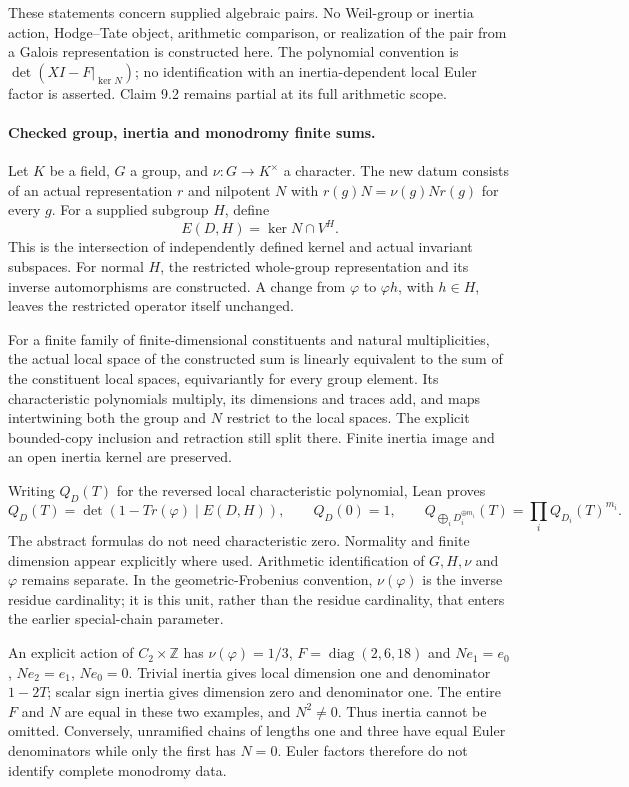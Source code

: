 \documentclass[11pt]{article}
\theoremstyle{definition}
\theoremstyle{remark}
\begin{document}
These statements concern supplied algebraic pairs. No Weil-group or inertia
action, Hodge--Tate object, arithmetic comparison, or realization of the pair
from a Galois representation is constructed here. The polynomial convention is
$\det(XI-F|_{\ker N})$; no identification with an inertia-dependent local
Euler factor is asserted. Claim 9.2 remains partial at its full arithmetic scope.


\paragraph{Checked group, inertia and monodromy finite sums.}\label{book:x-construction-12}
Let $K$ be a field, $G$ a group, and $\nu:G\to K^\times$ a character.
The new datum consists of an actual representation $r$ and nilpotent $N$ with
$r(g)N=\nu(g)Nr(g)$ for every $g$. For a supplied subgroup $H$, define
\[
 E(D,H)=\ker N\cap V^H.
\]
This is the intersection of independently defined kernel and actual invariant
subspaces. For normal $H$, the restricted whole-group representation and its
inverse automorphisms are constructed. A change from $\varphi$ to $\varphi h$,
with $h\in H$, leaves the restricted operator itself unchanged.

For a finite family of finite-dimensional constituents and natural multiplicities,
the actual local space of the constructed sum is linearly equivalent to the sum of the constituent local spaces, equivariantly
for every group element. Its characteristic polynomials multiply, its dimensions
and traces add, and maps intertwining both the group and $N$ restrict to the
local spaces. The explicit bounded-copy inclusion and retraction still split
there. Finite inertia image and an open inertia kernel are preserved.

Writing $Q_D(T)$ for the reversed local characteristic polynomial, Lean proves
\[
 Q_D(T)=\det(1-T r(\varphi)\mid E(D,H)),\qquad Q_D(0)=1,
 \qquad
 Q_{\bigoplus_iD_i^{\oplus m_i}}(T)=\prod_iQ_{D_i}(T)^{m_i}.
\]
The abstract formulas do not need characteristic zero. Normality and finite
dimension appear explicitly where used. Arithmetic identification of $G,H,\nu$
and $\varphi$ remains separate. In the geometric-Frobenius convention,
$\nu(\varphi)$ is the inverse residue cardinality; it is this unit, rather than
the residue cardinality, that enters the earlier special-chain parameter.

An explicit action of $C_2\times\mathbb Z$ has $\nu(\varphi)=1/3$,
$F=\operatorname{diag}(2,6,18)$ and $Ne_1=e_0$, $Ne_2=e_1$, $Ne_0=0$.
Trivial inertia gives local dimension one and denominator $1-2T$; scalar sign
inertia gives dimension zero and denominator one. The entire $F$ and $N$ are
equal in these two examples, and $N^2\ne0$. Thus inertia cannot be omitted.
Conversely, unramified chains of lengths one and three have equal Euler
denominators while only the first has $N=0$. Euler factors therefore do not
identify complete monodromy data.
\end{document}
